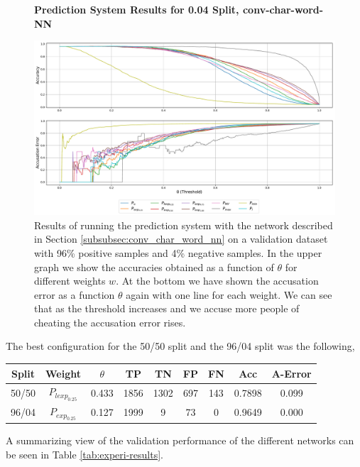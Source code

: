 \begin{figure}
    \centering
    \textbf{Prediction System Results for 0.04 Split, \glsdesc{conv-char-word-NN}}\par\medskip
    \includegraphics[scale=0.33]{./pictures/experiments/conv_char_word_nn/prediction_system_04}
    \caption{Results of running the prediction system with the network described
        in Section \ref{subsubsec:conv_char_word_nn} on a validation dataset
        with 96\% positive samples and 4\% negative samples. In the upper graph
        we show the accuracies obtained as a function of $\theta$ for different
        weights $w$. At the bottom we have shown the accusation error as a
        function $\theta$ again with one line for each weight. We can see that
        as the threshold increases and we accuse more people of cheating the
        accusation error rises.}
    \label{fig:conv-char-word-NN-pred-4}
\end{figure}

The best configuration for the 50/50 split and the 96/04 split was the
following,

\begin{center}
\begin{tabular}{|c|c|c|c|c|c|c|c|c|}
\hline
Split & Weight            & $\theta$ & TP  & TN  & FP & FN & Acc     & A-Error \\ \hline
50/50 & $P_{lexp_{0.25}}$ & 0.433    & 1856 & 1302 & 697 & 143 & 0.7898 & 0.099   \\ \hline
96/04 & $P_{exp_{0.25}}$  & 0.127    & 1999 & 9    & 73  & 0   & 0.9649 & 0.000   \\ \hline
\end{tabular}
\end{center}

A summarizing view of the validation performance of the different networks can
be seen in Table \ref{tab:experi-results}.

